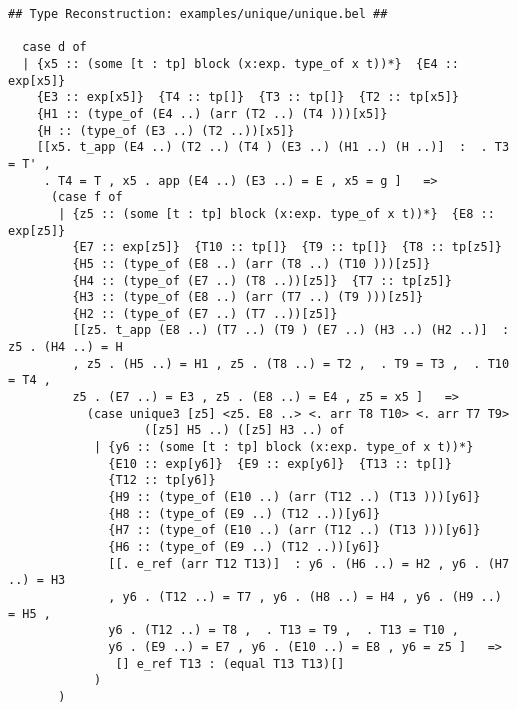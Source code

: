 \documentclass[12pt]{article}
\begin{document}
\footnotesize\begin{verbatim}
## Type Reconstruction: examples/unique/unique.bel ##

  case d of 
  | {x5 :: (some [t : tp] block (x:exp. type_of x t))*}  {E4 :: exp[x5]} 
    {E3 :: exp[x5]}  {T4 :: tp[]}  {T3 :: tp[]}  {T2 :: tp[x5]} 
    {H1 :: (type_of (E4 ..) (arr (T2 ..) (T4 )))[x5]} 
    {H :: (type_of (E3 ..) (T2 ..))[x5]}
    [[x5. t_app (E4 ..) (T2 ..) (T4 ) (E3 ..) (H1 ..) (H ..)]  :  . T3 = T' ,
     . T4 = T , x5 . app (E4 ..) (E3 ..) = E , x5 = g ]   => 
      (case f of 
       | {z5 :: (some [t : tp] block (x:exp. type_of x t))*}  {E8 :: exp[z5]} 
         {E7 :: exp[z5]}  {T10 :: tp[]}  {T9 :: tp[]}  {T8 :: tp[z5]} 
         {H5 :: (type_of (E8 ..) (arr (T8 ..) (T10 )))[z5]} 
         {H4 :: (type_of (E7 ..) (T8 ..))[z5]}  {T7 :: tp[z5]} 
         {H3 :: (type_of (E8 ..) (arr (T7 ..) (T9 )))[z5]} 
         {H2 :: (type_of (E7 ..) (T7 ..))[z5]}
         [[z5. t_app (E8 ..) (T7 ..) (T9 ) (E7 ..) (H3 ..) (H2 ..)]  : z5 . (H4 ..) = H
         , z5 . (H5 ..) = H1 , z5 . (T8 ..) = T2 ,  . T9 = T3 ,  . T10 = T4 ,
         z5 . (E7 ..) = E3 , z5 . (E8 ..) = E4 , z5 = x5 ]   => 
           (case unique3 [z5] <z5. E8 ..> <. arr T8 T10> <. arr T7 T9>
                   ([z5] H5 ..) ([z5] H3 ..) of 
            | {y6 :: (some [t : tp] block (x:exp. type_of x t))*} 
              {E10 :: exp[y6]}  {E9 :: exp[y6]}  {T13 :: tp[]} 
              {T12 :: tp[y6]} 
              {H9 :: (type_of (E10 ..) (arr (T12 ..) (T13 )))[y6]} 
              {H8 :: (type_of (E9 ..) (T12 ..))[y6]} 
              {H7 :: (type_of (E10 ..) (arr (T12 ..) (T13 )))[y6]} 
              {H6 :: (type_of (E9 ..) (T12 ..))[y6]}
              [[. e_ref (arr T12 T13)]  : y6 . (H6 ..) = H2 , y6 . (H7 ..) = H3
              , y6 . (T12 ..) = T7 , y6 . (H8 ..) = H4 , y6 . (H9 ..) = H5 ,
              y6 . (T12 ..) = T8 ,  . T13 = T9 ,  . T13 = T10 ,
              y6 . (E9 ..) = E7 , y6 . (E10 ..) = E8 , y6 = z5 ]   => 
               [] e_ref T13 : (equal T13 T13)[]
            )
       )
  

\end{verbatim}
\end{document}
